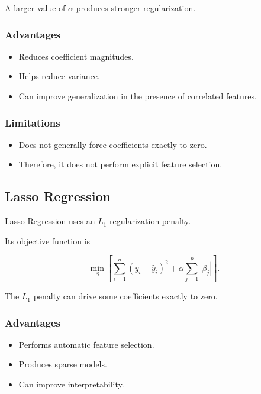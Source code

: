 \documentclass[12pt,a4paper]{article}
\begin{document}
A larger value of $\alpha$ produces stronger regularization.

\subsubsection{Advantages}

\begin{itemize}
    \item Reduces coefficient magnitudes.
    \item Helps reduce variance.
    \item Can improve generalization in the presence of correlated
    features.
\end{itemize}

\subsubsection{Limitations}

\begin{itemize}
    \item Does not generally force coefficients exactly to zero.
    \item Therefore, it does not perform explicit feature selection.
\end{itemize}

\subsection{Lasso Regression}

Lasso Regression uses an $L_1$ regularization penalty.

Its objective function is

\[
\min_{\beta}
\left[
\sum_{i=1}^{n}
(y_i-\hat{y}_i)^2
+
\alpha\sum_{j=1}^{p}|\beta_j|
\right].
\]

The $L_1$ penalty can drive some coefficients exactly to zero.

\subsubsection{Advantages}

\begin{itemize}
    \item Performs automatic feature selection.
    \item Produces sparse models.
    \item Can improve interpretability.
\end{itemize}
\end{document}
